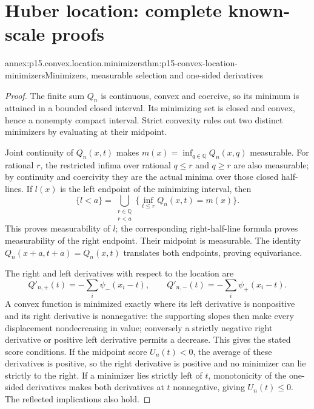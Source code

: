\section{Huber location: complete known-scale proofs}
\label{sec:annex-p15-huber-robust-location}

\begin{annexitem}{annex:p15.convex.location.minimizers}{thm:p15-convex-location-minimizers}{Minimizers, measurable selection and one-sided derivatives}
\begin{proof}
The finite sum \(Q_n\) is continuous, convex and coercive, so its
minimum is attained in a bounded closed interval. Its minimizing
set is closed and convex, hence a nonempty compact interval.
Strict convexity rules out two distinct minimizers by evaluating
at their midpoint.

Joint continuity of \(Q_n(x,t)\) makes
\(m(x)=\inf_{q\in\mathbb Q}Q_n(x,q)\) measurable.
For rational \(r\), the restricted infima over rational \(q\leq r\)
and \(q\geq r\) are also measurable; by continuity and coercivity
they are the actual minima over those closed half-lines.
If \(l(x)\) is the left endpoint of the minimizing interval, then
\[
 \{l<a\}=\bigcup_{\substack{r\in\mathbb Q\\r<a}}
              \{\inf_{t\leq r}Q_n(x,t)=m(x)\}.
\]
This proves measurability of \(l\); the corresponding right-half-line
formula proves measurability of the right endpoint. Their midpoint
is measurable. The identity
\(Q_n(x+a,t+a)=Q_n(x,t)\) translates both endpoints, proving equivariance.

The right and left derivatives with respect to the location are
\[
 Q'_{n,+}(t)=-\sum_i\psi_-(x_i-t),\qquad
 Q'_{n,-}(t)=-\sum_i\psi_+(x_i-t).
\]
A convex function is minimized exactly where its left derivative is
nonpositive and its right derivative is nonnegative: the supporting
slopes then make every displacement nondecreasing in value; conversely
a strictly negative right derivative or positive left derivative
permits a decrease. This gives the stated score conditions.
If the midpoint score \(U_n(t)<0\), the average of these derivatives
is positive, so the right derivative is positive and no minimizer
can lie strictly to the right. If a minimizer lies strictly left
of \(t\), monotonicity of the one-sided derivatives makes both
derivatives at \(t\) nonnegative, giving \(U_n(t)\leq0\).
The reflected implications also hold.
\end{proof}
\end{annexitem}

